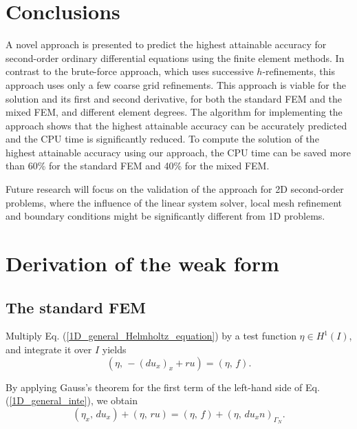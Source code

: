 \documentclass[review,3p]{elsarticle}
\begin{document}
\section{Conclusions}		\label{paragraph on conclusion}

A novel approach is presented to predict the highest attainable accuracy for second-order ordinary differential equations using the finite element methods.
In contrast to the brute-force approach, which uses successive $h$-refinements, this approach uses only a few coarse grid refinements. 
This approach is viable for the solution and its first and second derivative, for both the standard FEM and the mixed FEM, and different element degrees.
The algorithm for implementing the approach shows that the highest attainable accuracy can be accurately predicted and the CPU time is significantly reduced.
To compute the solution of the highest attainable accuracy using our approach, the CPU time can be saved more than 60\% for the standard FEM and 40\% for the mixed FEM.

Future research will focus on the validation of the approach for 2D second-order problems, where the influence of the linear system solver, local mesh refinement and boundary conditions might be significantly different from 1D problems. 

\appendix

\section{Derivation of the weak form}		\label{weak form appendix}

\subsection{The standard FEM}		\label{derivation_weak_form_SM}

Multiply Eq. (\ref{1D_general_Helmholtz_equation}) by a test function $\eta \in H ^1 (I)$, and integrate it over $I$ yields
\begin{equation}
(\eta, \, -\left(d u_x \right)_x + ru) = (\eta, \, f). \label{1D_general_inte}
\end{equation}

By applying Gauss's theorem for the first term of the left-hand side of Eq. (\ref{1D_general_inte}), we obtain
\begin{equation}
 ({\eta} _x, \, d u_x) + (\eta, \, ru) = (\eta, \, f) + \left( \eta, \, d u_x n \right)_{ {\Gamma_N}}.		\label{1D_general_gauss}
\end{equation}
\end{document}
